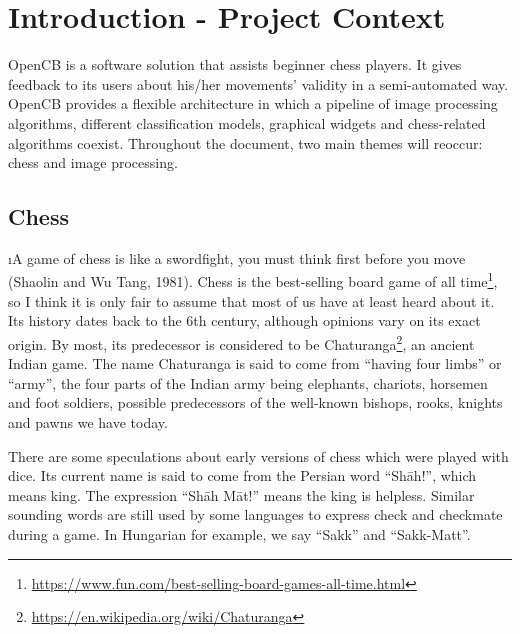 \chapter{Introduction - Project Context} \label{ch:introduction-project-context} \pagestyle{fancy}


OpenCB is a software solution that assists beginner chess players. It gives feedback to its users about his/her movements' validity in a semi-automated way. OpenCB provides a flexible architecture in which a pipeline of image processing algorithms, different classification models, graphical widgets and chess-related algorithms coexist. Throughout the document, two main themes will reoccur: chess and image processing.




\section{Chess}

\i{A game of chess is like a swordfight, you must think first before you move} (Shaolin and Wu Tang, 1981). Chess is the best-selling board game of all time\footnote{\url{https://www.fun.com/best-selling-board-games-all-time.html}}, so I think it is only fair to assume that most of us have at least heard about it. Its history dates back to the 6th century, although opinions vary on its exact origin. By most, its predecessor is considered to be Chaturanga\footnote{\url{https://en.wikipedia.org/wiki/Chaturanga}}, an ancient Indian game. The name Chaturanga is said to come from ``having four limbs'' or ``army'', the four parts of the Indian army being elephants, chariots, horsemen and foot soldiers, possible predecessors of the well-known bishops, rooks, knights and pawns we have today.

There are some speculations about early versions of chess which were played with dice. Its current name is said to come from the Persian word ``Shāh!'', which means king. The expression ``Shāh Māt!'' means the king is helpless. Similar sounding words are still used by some languages to express check and checkmate during a game. In Hungarian for example, we say ``Sakk'' and ``Sakk-Matt''.

